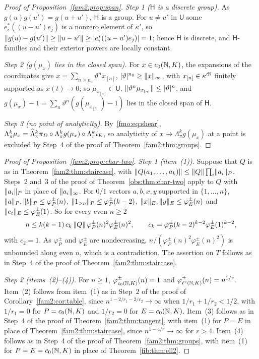 \begin{proof}[Proof of Proposition~\ref{fam2:prop:span}]
\emph{Step 1 ($\mathsf H$ is a discrete group).} As $g(u)g(u')=g(u+u')$, $\mathsf H$ is a group. For $u\ne u'$ in
$\mathsf U$ some $e_i^*((u-u')e_j)$ is a nonzero element of $\kappa'$, so
$\lVert g(u)-g(u')\rVert\ge\lVert u-u'\rVert\ge\lvert e_i^*((u-u')e_j)\rvert=1$; hence $\mathsf H$ is discrete, and $\mathsf H$-families and
their exterior powers are locally constant.

\emph{Step 2 ($g(\mu_x)$ lies in the closed span).} For $x\in c_0(\mathbb N,K)$, the expansions of the coordinates give
$x=\sum_{n\ge n_0}\vartheta^nx_{[n]}$, $\lvert \vartheta\rvert^{n_0}\ge\lVert x\rVert_\infty$, with $x_{[n]}\in\kappa'^{\mathbb N}$ finitely supported
as $x(t)\to0$; so $\mu_{x_{[n]}}\in\mathsf U$, $\lVert \vartheta^n\mu_{x_{[n]}}\rVert\le\lvert \vartheta\rvert^n$, and $g(\mu_x)-1=
\sum_n\vartheta^n(g(\mu_{x_{[n]}})-1)$ lies in the closed span of $\mathsf H$.

\emph{Step 3 (no point of analyticity).} By~\eqref{fmo:eq:shear},
$\Lambda^k_\pi\mu_x=\widehat\Lambda^k_\pi\pi_D\circ\Lambda^k_\pi g(\mu_x)\circ\Lambda^k_\pi i_E$, so analyticity of
$x\mapsto\Lambda^k_\pi g(\mu_x)$ at a point is excluded by Step~4 of the proof of Theorem~\ref{fam2:thm:groups}.
\end{proof}

\begin{proof}[Proof of Proposition~\ref{fam2:prop:char-two}]
\emph{Step 1 (item~(1)).} Suppose that $Q$ is as in Theorem~\ref{fam2:thm:staircase}, with
$\lVert Q(a_1,\dots,a_k)\rVert\le\lVert Q\rVert\prod_i\lVert a_i\rVert_P$. Steps~2 and~3 of the proof of Theorem~\ref{obs:thm:char-two}
apply to $Q$ with $\lVert a_i\rVert_P$ in place of $\lVert a_i\rVert_\infty$. For $0/1$ vectors $a,b,x,y$ supported in
$\{1,\dots,n\}$, $\lVert a\rVert_P,\lVert b\rVert_P\le\varphi^\pm_P(n)$, $\lVert 1_{>n}\rVert_P\le\varphi^\pm_P(k-2)$,
$\lVert x\rVert_E,\lVert y\rVert_E\le\varphi^\pm_E(n)$ and $\lVert e_t\rVert_E\le\varphi^\pm_E(1)$. So for every even $n\ge2$
\[
 n\le k(k-1)\,c_k\,\lVert Q\rVert\,\varphi^\pm_P(n)^2\varphi^\pm_E(n)^2,\qquad
 c_k=\varphi^\pm_P(k-2)^{k-2}\varphi^\pm_E(1)^{k-2},
\]
with $c_2=1$. As $\varphi^\pm_P$ and $\varphi^\pm_E$ are nondecreasing, $n/(\varphi^\pm_P(n)^2\varphi^\pm_E(n)^2)$ is
unbounded along even $n$, which is a contradiction. The assertion on $T$ follows as in Step~4 of the proof of
Theorem~\ref{fam2:thm:staircase}.

\emph{Step 2 (items~(2)--(4)).} For $n\ge1$, $\varphi^\pm_{c_0(\mathbb N,K)}(n)=1$ and $\varphi^\pm_{\ell^r(\mathbb N,K)}(n)=n^{1/r}$.
Item~(2) follows from item~(1) as in Step~2 of the proof of Corollary~\ref{fam2:cor:table}, since
$n^{1-2/r_1-2/r_2}\to\infty$ when $1/r_1+1/r_2<1/2$, with $1/r_1=0$ for $P=c_0(\mathbb N,K)$ and $1/r_2=0$ for $E=c_0(\mathbb N,K)$.
Item~(3) follows as in Step~4 of the proof of Theorem~\ref{fam2:thm:tangent}, with item~(1) for $P=E$ in place of
Theorem~\ref{fam2:thm:staircase}, since $n^{1-4/r}\to\infty$ for $r>4$. Item~(4) follows as in Step~4 of the proof of
Theorem~\ref{fam2:thm:groups}, with item~(1) for $P=E=c_0(\mathbb N,K)$ in place of Theorem~\ref{fib:thm:ell2}.
\end{proof}
